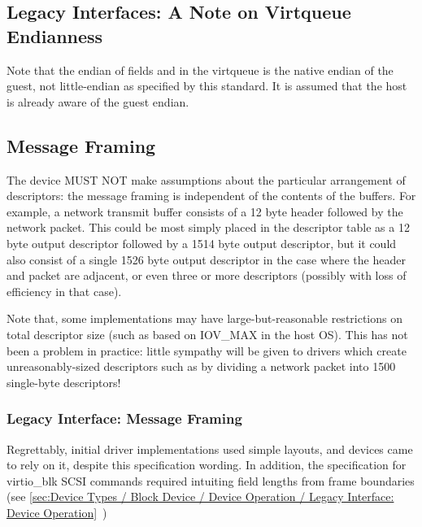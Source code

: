 \subsection{Legacy Interfaces: A Note on Virtqueue Endianness}\label{sec:Basic Facilities of a Virtio Device / Virtqueues / Legacy Interfaces: A Note on Virtqueue Endianness}

Note that the endian of fields and in the virtqueue is the native
endian of the guest, not little-endian as specified by this standard.
It is assumed that the host is already aware of the guest endian.

\subsection{Message Framing}\label{sec:Basic Facilities of a Virtio Device / Virtqueues / Message Framing}
The device MUST NOT make assumptions about the particular arrangement
of descriptors: the message framing is
independent of the contents of the buffers. For example, a network
transmit buffer consists of a 12 byte header followed by the network
packet. This could be most simply placed in the descriptor table as a
12 byte output descriptor followed by a 1514 byte output descriptor,
but it could also consist of a single 1526 byte output descriptor in
the case where the header and packet are adjacent, or even three or
more descriptors (possibly with loss of efficiency in that case).

Note that, some implementations may have large-but-reasonable
restrictions on total descriptor size (such as based on IOV_MAX in the
host OS). This has not been a problem in practice: little sympathy
will be given to drivers which create unreasonably-sized descriptors
such as by dividing a network packet into 1500 single-byte
descriptors!

\subsubsection{Legacy Interface: Message Framing}\label{sec:Basic Facilities of a Virtio Device / Virtqueues / Message Framing / Legacy Interface: Message Framing}

Regrettably, initial driver implementations used simple layouts, and
devices came to rely on it, despite this specification wording.  In
addition, the specification for virtio_blk SCSI commands required
intuiting field lengths from frame boundaries (see
 \ref{sec:Device Types / Block Device / Device Operation / Legacy Interface: Device Operation}~)

